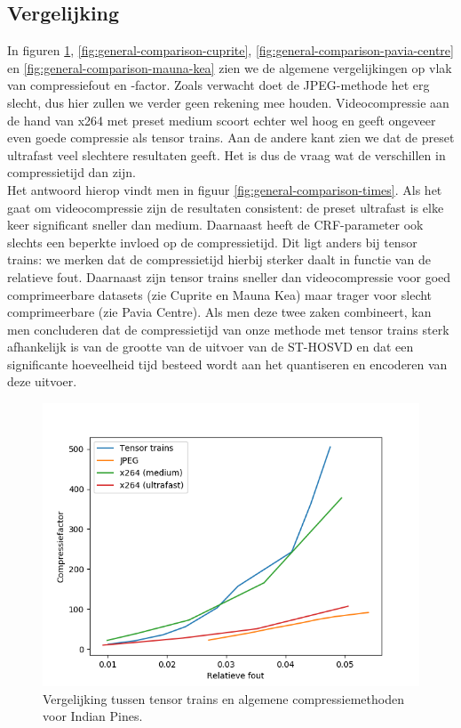 \subsection{Vergelijking}

In figuren \ref{fig:general-comparison-indian-pines}, \ref{fig:general-comparison-cuprite}, \ref{fig:general-comparison-pavia-centre} en \ref{fig:general-comparison-mauna-kea} zien we de algemene vergelijkingen op vlak van compressiefout en -factor. Zoals verwacht doet de JPEG-methode het erg slecht, dus hier zullen we verder geen rekening mee houden. Videocompressie aan de hand van x264 met preset medium scoort echter wel hoog en geeft ongeveer even goede compressie als tensor trains. Aan de andere kant zien we dat de preset ultrafast veel slechtere resultaten geeft. Het is dus de vraag wat de verschillen in compressietijd dan zijn.\\

Het antwoord hierop vindt men in figuur \ref{fig:general-comparison-times}. Als het gaat om videocompressie zijn de resultaten consistent: de preset ultrafast is elke keer significant sneller dan medium. Daarnaast heeft de CRF-parameter ook slechts een beperkte invloed op de compressietijd. Dit ligt anders bij tensor trains: we merken dat de compressietijd hierbij sterker daalt in functie van de relatieve fout. Daarnaast zijn tensor trains sneller dan videocompressie voor goed comprimeerbare datasets (zie Cuprite en Mauna Kea) maar trager voor slecht comprimeerbare (zie Pavia Centre). Als men deze twee zaken combineert, kan men concluderen dat de compressietijd van onze methode met tensor trains sterk afhankelijk is van de grootte van de uitvoer van de ST-HOSVD en dat een significante hoeveelheid tijd besteed wordt aan het quantiseren en encoderen van deze uitvoer.

\newpage
\begin{figure}[H]
  \centering
  \includegraphics[scale=0.7]{images/general_comparison_Indian_Pines.png}
  \caption{Vergelijking tussen tensor trains en algemene compressiemethoden voor Indian Pines.}
\label{fig:general-comparison-indian-pines}
\end{figure}

